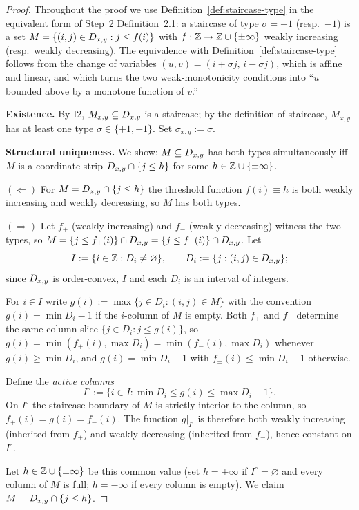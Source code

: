 \begin{proof}
Throughout the proof we use Definition~\ref{def:staircase-type} in the
equivalent form of Step~2 Definition~2.1: a staircase of type $\sigma=+1$
(resp.\ $-1$) is a set $M=\{(i,j)\in D_{x,y} : j\le f(i)\}$ with
$f:\mathbb{Z}\to\mathbb{Z}\cup\{\pm\infty\}$ weakly increasing (resp.\ weakly decreasing). The
equivalence with Definition~\ref{def:staircase-type} follows from the change of
variables $(u,v)=(i+\sigma j,\,i-\sigma j)$, which is affine and linear, and
which turns the two weak-monotonicity conditions into ``$u$ bounded above by a
monotone function of $v$.''

\medskip
\noindent\textbf{Existence.} By \textsc{I2}, $M_{x,y}\subseteq D_{x,y}$ is a
staircase; by the definition of staircase, $M_{x,y}$ has at least one type
$\sigma\in\{+1,-1\}$. Set $\sigma_{x,y}:=\sigma$.

\medskip
\noindent\textbf{Structural uniqueness.} We show: $M\subseteq D_{x,y}$ has both
types simultaneously iff $M$ is a coordinate strip
$D_{x,y}\cap\{j\le h\}$ for some $h\in\mathbb{Z}\cup\{\pm\infty\}$.

$(\Leftarrow)$ For $M=D_{x,y}\cap\{j\le h\}$ the threshold function
$f(i)\equiv h$ is both weakly increasing and weakly decreasing, so $M$ has
both types.

$(\Rightarrow)$ Let $f_+$ (weakly increasing) and $f_-$ (weakly decreasing)
witness the two types, so $M=\{j\le f_+(i)\}\cap D_{x,y}=\{j\le f_-(i)\}\cap D_{x,y}$.
Let
\[
  I := \{i\in\mathbb{Z} : D_i\ne\varnothing\}, \qquad
  D_i := \{j:(i,j)\in D_{x,y}\};
\]
since $D_{x,y}$ is order-convex, $I$ and each $D_i$ is an interval of integers.

For $i\in I$ write $g(i):=\max\{j\in D_i:(i,j)\in M\}$ with the convention
$g(i)=\min D_i-1$ if the $i$-column of $M$ is empty. Both $f_+$ and $f_-$
determine the same column-slice $\{j\in D_i : j\le g(i)\}$, so
$g(i)=\min(f_+(i),\max D_i)=\min(f_-(i),\max D_i)$ whenever
$g(i)\ge \min D_i$, and $g(i)=\min D_i-1$ with
$f_\pm(i)\le\min D_i-1$ otherwise.

Define the \emph{active columns}
\[
  I^{\circ}:=\{i\in I: \min D_i\le g(i)\le\max D_i-1\}.
\]
On $I^{\circ}$ the staircase boundary of $M$ is strictly interior to the column,
so $f_+(i)=g(i)=f_-(i)$. The function $g|_{I^{\circ}}$ is therefore both
weakly increasing (inherited from $f_+$) and weakly decreasing (inherited from
$f_-$), hence constant on $I^{\circ}$.

Let $h\in\mathbb{Z}\cup\{\pm\infty\}$ be this common value (set $h=+\infty$ if
$I^{\circ}=\varnothing$ and every column of $M$ is full; $h=-\infty$ if every
column is empty). We claim $M=D_{x,y}\cap\{j\le h\}$.


\end{proof}
